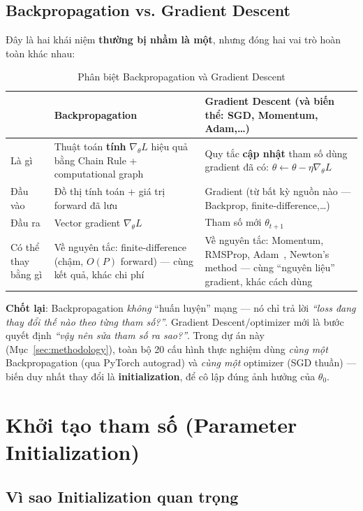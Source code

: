 \documentclass[12pt,a4paper]{report}
\begin{document}
\subsection{Backpropagation vs. Gradient Descent}
\label{sec:bp_vs_gd}

Đây là hai khái niệm \textbf{thường bị nhầm là một}, nhưng đóng hai vai trò
hoàn toàn khác nhau:

\begin{table}[htbp]
\centering
\caption{Phân biệt Backpropagation và Gradient Descent}
\begin{tabular}{@{}p{2.6cm}p{5.7cm}p{6.3cm}@{}}
\toprule
 & \textbf{Backpropagation} & \textbf{Gradient Descent (và biến thể: SGD, Momentum, Adam,\ldots)} \\
\midrule
Là gì & Thuật toán \textbf{tính} $\nabla_\theta L$ hiệu quả bằng Chain Rule + computational graph & Quy tắc \textbf{cập nhật} tham số dùng gradient đã có: $\theta\leftarrow\theta-\eta\nabla_\theta L$ \\
Đầu vào & Đồ thị tính toán + giá trị forward đã lưu & Gradient (từ bất kỳ nguồn nào --- Backprop, finite-difference,\ldots) \\
Đầu ra & Vector gradient $\nabla_\theta L$ & Tham số mới $\theta_{t+1}$ \\
Có thể thay bằng gì & Về nguyên tắc: finite-difference (chậm, $O(P)$ forward) --- cùng kết quả, khác chi phí & Về nguyên tắc: Momentum, RMSProp, Adam~\citep{kingma2015adam}, Newton's method --- cùng ``nguyên liệu'' gradient, khác cách dùng \\
\bottomrule
\end{tabular}
\label{tab:bp_vs_gd}
\end{table}

\textbf{Chốt lại}: Backpropagation \emph{không} ``huấn luyện'' mạng --- nó
chỉ trả lời \emph{``loss đang thay đổi thế nào theo từng tham số?''}.
Gradient Descent/optimizer mới là bước quyết định \emph{``vậy nên sửa tham
số ra sao?''}. Trong dự án này (Mục~\ref{sec:methodology}), toàn bộ 20 cấu
hình thực nghiệm dùng \emph{cùng một} Backpropagation (qua PyTorch autograd)
và \emph{cùng một} optimizer (SGD thuần) --- biến duy nhất thay đổi là
\textbf{initialization}, để cô lập đúng ảnh hưởng của $\theta_0$.

\section{Khởi tạo tham số (Parameter Initialization)}
\label{sec:init}

\subsection{Vì sao Initialization quan trọng}
\end{document}
